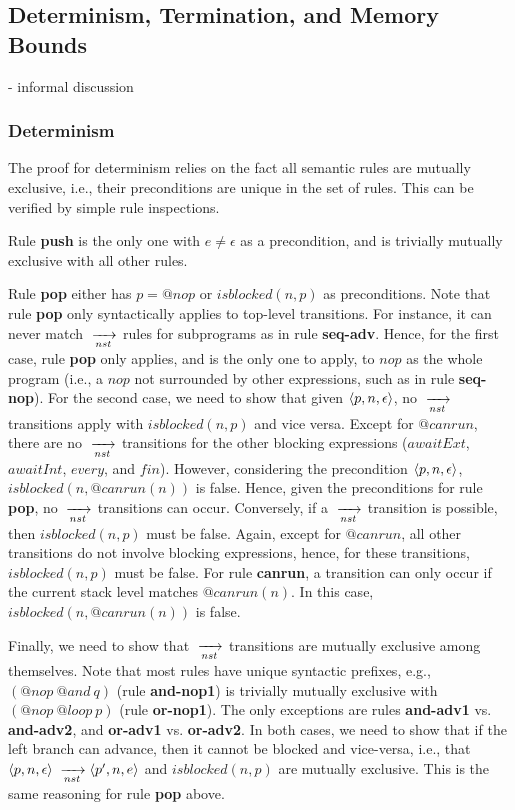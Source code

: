 \subsection{Determinism, Termination, and Memory Bounds}

- informal discussion

\subsubsection*{Determinism}

The proof for determinism relies on the fact all semantic rules are mutually
exclusive, i.e., their preconditions are unique in the set of rules.
This can be verified by simple rule inspections.

Rule \textbf{push} is the only one with $e \neq \epsilon$ as a precondition,
and is trivially mutually exclusive with all other rules.

Rule \textbf{pop} either has $p=@nop$ or $isblocked(n,p)$ as preconditions.
%
Note that rule \textbf{pop} only syntactically applies to top-level
transitions.
For instance, it can never match $\;\xrightarrow[nst]{\;}$ rules for subprograms as in rule
\textbf{seq-adv}.
%
Hence, for the first case, rule \textbf{pop} only applies, and is the only one
to apply, to $nop$ as the whole program (i.e., a $nop$ not surrounded by other
expressions, such as in rule \textbf{seq-nop}).
%
For the second case, we need to show that given $\langle p,n,\epsilon \rangle$, no
$\;\xrightarrow[nst]{\;}$ transitions apply with $isblocked(n,p)$ and vice versa.
Except for $@canrun$, there are no $\;\xrightarrow[nst]{\;}$ transitions for the other blocking
expressions ($awaitExt$, $awaitInt$, $every$, and $fin$).
However, considering the precondition $\langle p,n,\epsilon \rangle$,
$isblocked(n,@canrun(n))$ is false.
Hence, given the preconditions for rule \textbf{pop}, no $\;\xrightarrow[nst]{\;}$ transitions can
occur.
Conversely, if a $\;\xrightarrow[nst]{\;}$ transition is possible, then $isblocked(n,p)$ must be
false.
Again, except for $@canrun$, all other transitions do not involve blocking
expressions, hence, for these transitions, $isblocked(n,p)$ must be false.
For rule \textbf{canrun}, a transition can only occur if the current stack
level matches $@canrun(n)$.
In this case, $isblocked(n,@canrun(n))$ is false.

Finally, we need to show that $\;\xrightarrow[nst]{\;}$ transitions are mutually exclusive among
themselves.
%
Note that most rules have unique syntactic prefixes, e.g., $(@nop~@and~q)$
(rule \textbf{and-nop1}) is trivially mutually exclusive with $(@nop~@loop~p)$
(rule \textbf{or-nop1}).
%
The only exceptions are rules \textbf{and-adv1} vs. \textbf{and-adv2}, and
\textbf{or-adv1} vs. \textbf{or-adv2}.
In both cases, we need to show that if the left branch can advance, then it
cannot be blocked and vice-versa, i.e., that 
$\langle p,n,\epsilon \rangle \;\xrightarrow[nst]{\;} \langle p',n,e \rangle$ and $isblocked(n,p)$ are mutually
exclusive.
This is the same reasoning for rule \textbf{pop} above.

